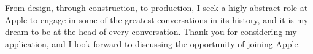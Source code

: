 \documentclass[11pt,a4paper,sans]{moderncv}        %
\begin{document}
From design, through construction, to production, I seek a higly abstract role at Apple to engage in some of the greatest conversations in its history, and it is my dream to be at the head of every conversation. Thank you for considering my application, and I look forward to discussing the opportunity of joining Apple.


\makeletterclosing
\end{document}
